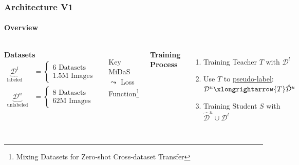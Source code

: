 \documentclass[12pt]{beamer}
\begin{document}
\begin{frame}
    \frametitle{Architecture V1}
    \framesubtitle{Overview}
    
    \begin{columns}
        
        
        \textbf{Datasets}
        \begin{equation*}
            \begin{aligned}
                \underbrace{\mathcal{D}^l}_{\text{labeled}} &= 
                \begin{cases} 
                    \text{6 Datasets} \\ 
                    \text{1.5M Images} 
                \end{cases} \\
                \underbrace{\mathcal{D}^u}_{\text{unlabeled}} &= 
                \begin{cases} 
                    \text{8 Datasets} \\ 
                    \text{62M Images} 
                \end{cases}
            \end{aligned}
        \end{equation*}
        \pause
        \begin{itemize}
            \item[Key] MiDaS $\leadsto$ Loss Function\footnote{Mixing Datasets for
            Zero-shot Cross-dataset Transfer}
        \end{itemize}
        
        
        \pause
        \textbf{Training Process}
        \begin{enumerate}
            \item<4-> Training Teacher $T$ with $\mathcal{D}^l$
            
            \item<5-> Use $T$ to \underline{pseudo-label}:
            \\$\mathcal{D}^u \xlongrightarrow{T} \hat{\mathcal{D}}^u $
            
            \item<6-> Training Student $S$ with $\hat{\mathcal{D}}^u \cup \mathcal{D}^l$
        \end{enumerate}
    
    \end{columns}
\end{frame}
\end{document}
